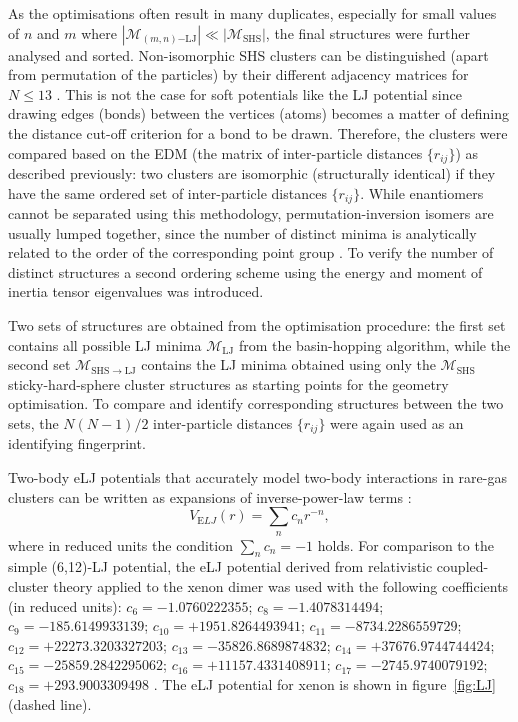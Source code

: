 As the optimisations often result in many duplicates, especially for small
values of $n$ and $m$ where $|\mathcal{M}_{(m,n)\mathrm{-LJ}}| \ll
|\mathcal{M}_\mathrm{SHS}|$, the final structures were further analysed and
sorted. Non-isomorphic \ac{SHS} clusters can be distinguished (apart from
permutation of the particles) by their different adjacency matrices for $N \leq
13$ \autocite{Holmes-Cerfon_EnumeratingRigidSphere_2016}. This is not the case
for soft potentials like the \ac{LJ} potential since drawing edges (bonds)
between the vertices (atoms) becomes a matter of defining the distance cut-off
criterion for a bond to be drawn. Therefore, the clusters were compared based on
the \ac{EDM} (the matrix of inter-particle distances $\{r_{ij}\}$) as described
previously: two clusters are isomorphic (structurally identical) if they have
the same ordered set of inter-particle distances $\{r_{ij}\}$. While enantiomers
cannot be separated using this methodology, permutation-inversion isomers are
usually lumped together, since the number of distinct minima is analytically
related to the order of the corresponding point group
\autocite{Wales_Energylandscapes_2003}. To verify the number of distinct
structures a second ordering scheme using the energy and moment of inertia
tensor eigenvalues was introduced. 

Two sets of structures are obtained from the optimisation procedure: the first
set contains all possible \ac{LJ} minima $\mathcal{M}_\mathrm{LJ}$ from the
basin-hopping algorithm, while the second set $\mathcal{M}_\mathrm{SHS\to LJ}$
contains the \ac{LJ} minima obtained using only the $\mathcal{M}_\mathrm{SHS}$
sticky-hard-sphere cluster structures as starting points for the geometry
optimisation. To compare and identify corresponding structures between the two
sets, the $N(N-1)/2$ inter-particle distances $\{r_{ij}\}$ were again used as an
identifying fingerprint.

Two-body \acf{eLJ} potentials that accurately model two-body interactions in
rare-gas clusters can be written as expansions of inverse-power-law terms
\autocite{Schwerdtfeger_ExtensionLennardJonespotential_2006}:
%
\begin{equation} \label{eq:ELJ}
V_{\mathrm ELJ}(r)=\sum_{n} c_nr^{-n},
\end{equation}
%
where in reduced units the condition $\sum_{n} c_n=-1$ holds. For comparison
to the simple (6,12)-\ac{LJ} potential, the \ac{eLJ} potential derived from
relativistic coupled-cluster theory applied to the xenon dimer was used with the
following coefficients (in reduced units):
$c_6=-1.0760222355$; $c_8=-1.4078314494$; $c_9=-185.6149933139$;
$c_{10}=+1951.8264493941$; $c_{11}=-8734.2286559729$;
$c_{12}=+22273.3203327203$; $c_{13}=-35826.8689874832$;
$c_{14}=+37676.9744744424$; $c_{15}=-25859.2842295062$;
$c_{16}=+11157.4331408911$; $c_{17}=-2745.9740079192$; $c_{18}=+293.9003309498$
\autocite{Jerabek_relativisticcoupledclusterinteraction_2017}. The \ac{eLJ}
potential for xenon is shown in figure~\ref{fig:LJ} (dashed line).



